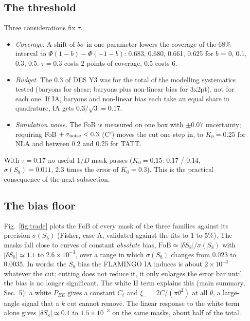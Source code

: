 \documentclass[11pt]{article}
\newcommand{\fob}{\mathrm{FoB}}
\begin{document}
\subsection{The threshold}\label{sec:threshold}
Three considerations fix $\tau$.
\begin{itemize}[itemsep=2pt]
\item \emph{Coverage.} A shift of $b\sigma$ in one parameter lowers the
  coverage of the 68\% interval to $\Phi(1-b) - \Phi(-1-b)$: 0.683, 0.680,
  0.661, 0.625 for $b$ = 0, 0.1, 0.3, 0.5. $\tau = 0.3$ costs 2 points of
  coverage, $0.5$ costs 6.
\item \emph{Budget.} The 0.3 of DES Y3 was for the total of the modelling
  systematics tested (baryons for shear; baryons plus non-linear bias for
  3x2pt), not for each one. If IA, baryons and non-linear bias each take an
  equal share in quadrature, IA gets $0.3/\sqrt3 = 0.17$.
\item \emph{Simulation noise.} The FoB is measured on one box with
  $\pm0.07$ uncertainty; requiring FoB $+\,\sigma_{\rm noise} < 0.3$ (C$'$)
  moves the cut one step in, to $K_0 = 0.25$ for NLA and between 0.2 and
  0.25 for TATT.
\end{itemize}
With $\tau = 0.17$ no useful $1/D$ mask passes ($K_0 = 0.15$: 0.17 / 0.14,
$\sigma(S_8) = 0.011$, 2.3 times the error of $K_0 = 0.3$). This is the
practical consequence of the next subsection.

\subsection{The bias floor}\label{sec:floor}\label{sec:tradeoff}
Fig.~\ref{fig:trade} plots the FoB of every mask of the three families
against its precision $\sigma(S_8)$ (Fisher, case A, validated against the
fits to 1 to 5\%). The masks fall close to curves of constant
\emph{absolute} bias, $\fob \simeq |\delta S_8|/\sigma(S_8)$ with
$|\delta S_8| \simeq 1.1$ to $2.6 \times 10^{-3}$, over a range in which
$\sigma(S_8)$ changes from 0.023 to 0.0035. In words: the $S_8$ bias the
FLAMINGO IA induces is about $2\times10^{-3}$ whatever the cut; cutting does
not reduce it, it only enlarges the error bar until the bias is no longer
significant. The white II term explains this (main summary, Sec.~5): a
white $P_{EE}$ gives a constant $C_\ell$ and $\xi_- = 2C/(\pi\theta^2)$ at
all $\theta$, a large-angle signal that a $k$ cut cannot remove. The linear
response to the white term alone gives $|\delta S_8| \simeq 0.4$ to
$1.5\times10^{-3}$ on the same masks, about half of the total.
\end{document}
